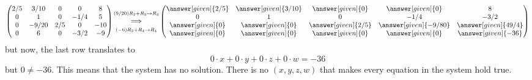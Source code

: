 \documentclass{ximera}
\begin{document}
\begin{example}[No solutions]
\begin{explanation}
\[\begin{pmatrix}
      {2/5}&  {3/10} & {0} &{0} &8 \\
  {0}&  {1} & {0} &{-1/4} & 5\\
  {0}&  {-9/20} & {2/5} &{0} &-10\\
  {0}&  {6} & {0} &{-3/2} &-9
\end{pmatrix}
\begin{matrix}
  \scriptstyle (9/20) R_2 + R_3\to R_3\\
  \Longrightarrow \\
  \scriptstyle(-6) R_2+R_4\to R_4
\end{matrix}
\begin{pmatrix}
   \answer[given]{2/5}&  \answer[given]{3/10} & \answer[given]{0} &\answer[given]{0} &8 \\
  {0}&  {1} & {0} &{-1/4} & -3/2\\
  \answer[given]{0}&  \answer[given]{0} & \answer[given]{2/5} &\answer[given]{-9/80} &\answer[given]{49/4}\\
  \answer[given]{0}&  \answer[given]{0} & \answer[given]{0} &\answer[given]{0} &\answer[given]{-36}
\end{pmatrix}
\]
but now, the last row translates to 
\[
0\cdot x+0\cdot y+0\cdot z+0\cdot w=-36
\]
but $0\ne -36$. This means that the system has no solution. There is
no $(x,y,z,w)$ that makes every equation in the system hold true.
\end{explanation}
\end{example}
\end{document}
